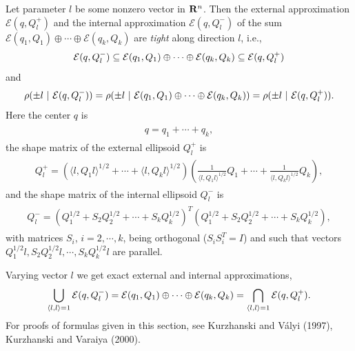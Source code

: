 \documentclass[letterpaper,10pt,english]{sphinxmanual}
\begin{document}
Let parameter $l$ be some nonzero vector in ${\bf R}^n$.
Then the external approximation ${\mathcal E}(q,Q_l^+)$ and the
internal approximation ${\mathcal E}(q,Q_l^-)$ of the sum
${\mathcal E}(q_1,Q_1)\oplus\cdots\oplus{\mathcal E}(q_k,Q_k)$ are
\emph{tight} along direction $l$, i.e.,
\begin{gather}
\begin{split}{\mathcal E}(q,Q_l^-)\subseteq{\mathcal E}(q_1,Q_1)\oplus\cdots\oplus{\mathcal E}(q_k,Q_k)
\subseteq{\mathcal E}(q,Q_l^+)\end{split}\notag
\end{gather}
and
\begin{gather}
\begin{split}\rho(\pm l ~|~ {\mathcal E}(q,Q_l^-)) =
\rho(\pm l ~|~ {\mathcal E}(q_1,Q_1)\oplus\cdots\oplus{\mathcal E}(q_k,Q_k)) =
\rho(\pm l ~|~ {\mathcal E}(q,Q_l^+)).\end{split}\notag
\end{gather}
Here the center $q$ is
\label{chap_ellcalc:equation-minksum_c}\begin{gather}
\begin{split}q = q_1 + \cdots + q_k ,\end{split}\label{chap_ellcalc-minksum_c}
\end{gather}
the shape matrix of the external ellipsoid $Q_l^+$ is
\label{chap_ellcalc:equation-minksum_ea}\begin{gather}
\begin{split}Q_l^+ = \left(\langle l,Q_1l\rangle^{1/2} + \cdots
+ \langle l,Q_kl\rangle^{1/2}\right)
\left(\frac{1}{\langle l,Q_1l\rangle^{1/2}}Q_1 + \cdots +
\frac{1}{\langle l,Q_kl\rangle^{1/2}}Q_k\right),\end{split}\label{chap_ellcalc-minksum_ea}
\end{gather}
and the shape matrix of the internal ellipsoid $Q_l^-$ is
\label{chap_ellcalc:equation-minksum_ia}\begin{gather}
\begin{split}Q_l^- = \left(Q_1^{1/2} + S_2Q_2^{1/2} + \cdots + S_kQ_k^{1/2}\right)^T
\left(Q_1^{1/2} + S_2Q_2^{1/2} + \cdots + S_kQ_k^{1/2}\right),\end{split}\label{chap_ellcalc-minksum_ia}
\end{gather}
with matrices $S_i$, $i=2,\cdots,k$, being orthogonal
($S_iS_i^T=I$) and such that vectors
$Q_1^{1/2}l, S_2Q_2^{1/2}l, \cdots, S_kQ_k^{1/2}l$ are parallel.

Varying vector $l$ we get exact external and internal
approximations,
\begin{gather}
\begin{split}\bigcup_{\langle l,l\rangle=1} {\mathcal E}(q,Q_l^-) =
{\mathcal E}(q_1,Q_1)\oplus\cdots\oplus{\mathcal E}(q_k,Q_k) =
\bigcap_{\langle l,l\rangle=1} {\mathcal E}(q,Q_l^+) .\end{split}\notag
\end{gather}
For proofs of formulas given in this section, see Kurzhanski and Vályi
(1997), Kurzhanski and Varaiya (2000).
\end{document}
